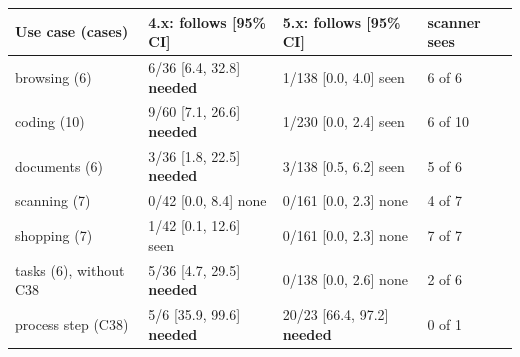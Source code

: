 \begin{tabular}{@{}llll@{}}\toprule
Use case (cases) & 4.x: follows [95\% CI] & 5.x: follows [95\% CI] & scanner sees\\\midrule
browsing (6) & 6/36 [6.4, 32.8] \textbf{needed} & 1/138 [0.0, 4.0] seen & 6 of 6\\
coding (10) & 9/60 [7.1, 26.6] \textbf{needed} & 1/230 [0.0, 2.4] seen & 6 of 10\\
documents (6) & 3/36 [1.8, 22.5] \textbf{needed} & 3/138 [0.5, 6.2] seen & 5 of 6\\
scanning (7) & 0/42 [0.0, 8.4] none & 0/161 [0.0, 2.3] none & 4 of 7\\
shopping (7) & 1/42 [0.1, 12.6] seen & 0/161 [0.0, 2.3] none & 7 of 7\\
tasks (6), without C38 & 5/36 [4.7, 29.5] \textbf{needed} & 0/138 [0.0, 2.6] none & 2 of 6\\
process step (C38) & 5/6 [35.9, 99.6] \textbf{needed} & 20/23 [66.4, 97.2] \textbf{needed} & 0 of 1\\
\bottomrule
\end{tabular}
